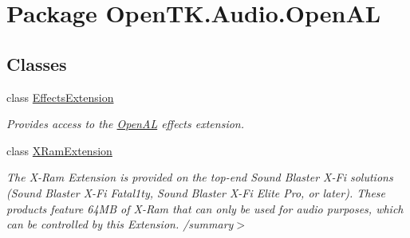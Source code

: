 \hypertarget{namespace_open_t_k_1_1_audio_1_1_open_a_l}{\section{Package Open\-T\-K.\-Audio.\-Open\-A\-L}
\label{namespace_open_t_k_1_1_audio_1_1_open_a_l}
}
\subsection*{Classes}
\begin{DoxyCompactItemize}
\item 
class \hyperlink{class_open_t_k_1_1_audio_1_1_open_a_l_1_1_effects_extension}{Effects\-Extension}
\begin{DoxyCompactList}\small\item\em Provides access to the \hyperlink{namespace_open_t_k_1_1_audio_1_1_open_a_l}{Open\-A\-L} effects extension. \end{DoxyCompactList}\item 
class \hyperlink{class_open_t_k_1_1_audio_1_1_open_a_l_1_1_x_ram_extension}{X\-Ram\-Extension}
\begin{DoxyCompactList}\small\item\em The X-\/\-Ram Extension is provided on the top-\/end Sound Blaster X-\/\-Fi solutions (Sound Blaster X-\/\-Fi Fatal1ty, Sound Blaster X-\/\-Fi Elite Pro, or later). These products feature 64\-M\-B of X-\/\-Ram that can only be used for audio purposes, which can be controlled by this Extension. /summary$>$ \end{DoxyCompactList}\end{DoxyCompactItemize}
